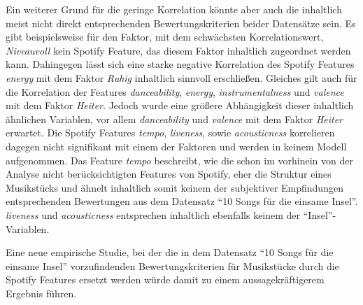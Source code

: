 Ein weiterer Grund für die geringe Korrelation könnte aber auch die inhaltlich meist nicht direkt entsprechenden Bewertungskriterien beider Datensätze sein.
Es gibt beispielsweise für den Faktor, mit dem schwächsten Korrelationswert, \textit{Niveauvoll} kein Spotify Feature, das diesem Faktor inhaltlich zugeordnet werden kann.
Dahingegen lässt sich eine starke negative Korrelation des Spotify Features \textit{energy} mit dem Faktor \textit{Ruhig} inhaltlich sinnvoll erschließen.
Gleiches gilt auch für die Korrelation der Features \textit{danceability}, \textit{energy}, \textit{instrumentalness} und \textit{valence} mit dem Faktor \textit{Heiter}.
Jedoch wurde eine größere Abhängigkeit dieser inhaltlich ähnlichen Variablen, vor allem \textit{danceability} und \textit{valence} mit dem Faktor \textit{Heiter} erwartet.
Die Spotify Features \textit{tempo}, \textit{liveness}, sowie \textit{acousticness} korrelieren dagegen nicht signifikant mit einem der Faktoren und werden in keinem Modell aufgenommen. 
Das Feature \textit{tempo} beschreibt, wie die schon im vorhinein von der Analyse nicht berücksichtigten Features von Spotify, eher die Struktur eines Musikstücks und ähnelt inhaltlich somit keinem der subjektiver Empfindungen entsprechenden Bewertungen aus dem Datensatz "`10 Songs für die einsame Insel"'.
\textit{liveness} und \textit{acousticness} entsprechen inhaltlich ebenfalls keinem der "`Insel"'-Variablen.  

Eine neue empirische Studie, bei der die in dem Datensatz "`10 Songs für die einsame Insel"' vorzufindenden Bewertungskriterien für Musikstücke durch die Spotify Features ersetzt werden würde damit zu einem aussagekräftigerem Ergebnis führen.



